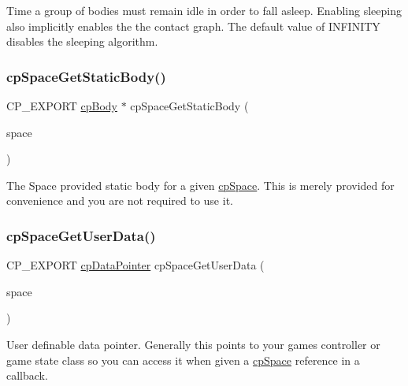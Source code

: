 Time a group of bodies must remain idle in order to fall asleep. Enabling sleeping also implicitly enables the the contact graph. The default value of I\+N\+F\+I\+N\+I\+TY disables the sleeping algorithm. \mbox{\label{group__cpSpace_gaaf1306bc87ee883855311aabafb10363}} 
\subsubsection{\texorpdfstring{cp\+Space\+Get\+Static\+Body()}{cpSpaceGetStaticBody()}}
{\footnotesize\ttfamily C\+P\+\_\+\+E\+X\+P\+O\+RT \hyperlink{structcpBody}{cp\+Body} $\ast$ cp\+Space\+Get\+Static\+Body (\begin{DoxyParamCaption}\item[{const \hyperlink{structcpSpace}{cp\+Space} $\ast$}]{space }\end{DoxyParamCaption})}

The Space provided static body for a given \hyperlink{structcpSpace}{cp\+Space}. This is merely provided for convenience and you are not required to use it. \mbox{\label{group__cpSpace_ga20f6bbc8db7698065052f4502050dc52}} 
\subsubsection{\texorpdfstring{cp\+Space\+Get\+User\+Data()}{cpSpaceGetUserData()}}
{\footnotesize\ttfamily C\+P\+\_\+\+E\+X\+P\+O\+RT \hyperlink{group__basicTypes_ga2ac2c3c31e21893941f9e4f8ee279447}{cp\+Data\+Pointer} cp\+Space\+Get\+User\+Data (\begin{DoxyParamCaption}\item[{const \hyperlink{structcpSpace}{cp\+Space} $\ast$}]{space }\end{DoxyParamCaption})}

User definable data pointer. Generally this points to your game\textquotesingle{}s controller or game state class so you can access it when given a \hyperlink{structcpSpace}{cp\+Space} reference in a callback. 
